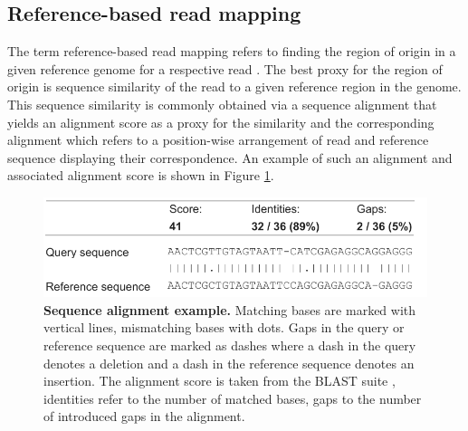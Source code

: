 
\subsection{Reference-based read mapping}

The term reference-based read mapping refers to finding the region of origin in a given reference genome for a respective read \citep{Canzar2015}. The best proxy for the region of origin is sequence similarity of the read to a given reference region in the genome. This sequence similarity is commonly obtained via a sequence alignment that yields an alignment score as a proxy for the similarity and the corresponding alignment which refers to a position-wise arrangement of read and reference sequence displaying their correspondence. An example of such an alignment and associated alignment score is shown in Figure \ref{fig:sequence_alignment}.

\begin{figure}[h]
	 \centering
	 \includegraphics[width=0.7\linewidth]{img/chapter1/sequencealignment}
	  \caption[Sequence alignment example]{\textbf{Sequence alignment example.} Matching bases are marked with vertical lines, mismatching bases with dots. Gaps in the query or reference sequence are marked as dashes where a dash in the query denotes a deletion and a dash in the reference sequence denotes an insertion. The alignment score is taken from the BLAST suite \citep{Camacho2009}, identities refer to the number of matched bases, gaps to the number of introduced gaps in the alignment.}
	 \label{fig:sequence_alignment}
\end{figure}

